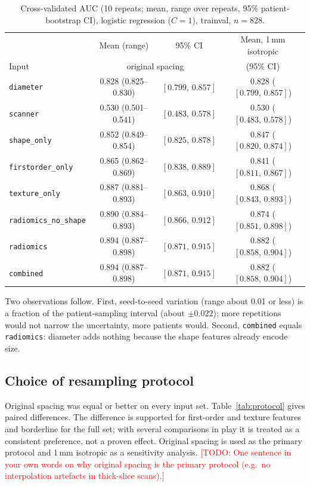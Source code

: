 \documentclass[journal]{IEEEtran}
\newcommand{\TODO}[1]{\textcolor{red}{[TODO: #1]}}
\newcommand{\auc}{\mathrm{AUC}}
\newcommand{\ci}[2]{[#1,\,#2]}            %
\newcommand{\code}[1]{\texttt{#1}}
\begin{document}
\begin{table}[!t]
\caption{Cross-validated $\auc$ (10 repeats; mean, range over repeats, 95\% patient-bootstrap CI), logistic regression
($C=1$), trainval, $n=828$.}
\label{tab:baselines}
\centering\small
\begin{tabular}{lccc}
\toprule
 & Mean (range) & 95\% CI & Mean, 1\,mm isotropic\\
Input &  \multicolumn{2}{c}{original spacing} & (95\% CI)\\
\midrule
\code{diameter}            & 0.828 (0.825--0.830) & $\ci{0.799}{0.857}$ & 0.828 ($\ci{0.799}{0.857}$)\\
\code{scanner}             & 0.530 (0.501--0.541) & $\ci{0.483}{0.578}$ & 0.530 ($\ci{0.483}{0.578}$)\\
\code{shape\_only}         & 0.852 (0.849--0.854) & $\ci{0.825}{0.878}$ & 0.847 ($\ci{0.820}{0.874}$)\\
\code{firstorder\_only}    & 0.865 (0.862--0.869) & $\ci{0.838}{0.889}$ & 0.841 ($\ci{0.811}{0.867}$)\\
\code{texture\_only}       & 0.887 (0.881--0.893) & $\ci{0.863}{0.910}$ & 0.868 ($\ci{0.843}{0.893}$)\\
\code{radiomics\_no\_shape}& 0.890 (0.884--0.893) & $\ci{0.866}{0.912}$ & 0.874 ($\ci{0.851}{0.898}$)\\
\code{radiomics}           & 0.894 (0.887--0.898) & $\ci{0.871}{0.915}$ & 0.882 ($\ci{0.858}{0.904}$)\\
\code{combined}            & 0.894 (0.887--0.898) & $\ci{0.871}{0.915}$ & 0.882 ($\ci{0.858}{0.904}$)\\
\bottomrule
\end{tabular}
\end{table}

Two observations follow. First, seed-to-seed variation (range about 0.01 or less) is a fraction of the patient-sampling
interval (about $\pm0.022$); more repetitions would not narrow the uncertainty, more patients would. Second,
\code{combined} equals \code{radiomics}: diameter adds nothing because the shape features already encode size.

\subsection{Choice of resampling protocol}
\label{sec:protocol}
Original spacing was equal or better on every input set. Table~\ref{tab:protocol} gives paired differences.
The difference is supported for first-order and texture features and borderline for the full set; with several
comparisons in play it is treated as a consistent preference, not a proven effect. Original spacing is used as the
primary protocol and 1\,mm isotropic as a sensitivity analysis.
\TODO{One sentence in your own words on why original spacing is the primary protocol (e.g.\ no interpolation
artefacts in thick-slice scans).}
\end{document}
